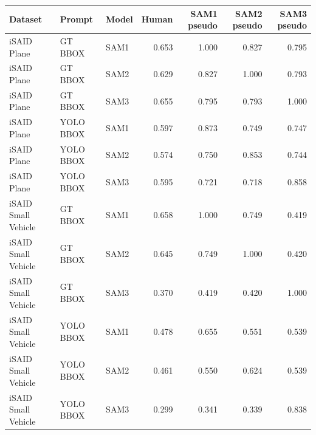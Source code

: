 \begin{tabular}{lllrrrr}
\toprule
Dataset & Prompt & Model & Human & SAM1 pseudo & SAM2 pseudo & SAM3 pseudo \\
\midrule
iSAID Plane & GT BBOX & SAM1 & 0.653 & 1.000 & 0.827 & 0.795 \\
iSAID Plane & GT BBOX & SAM2 & 0.629 & 0.827 & 1.000 & 0.793 \\
iSAID Plane & GT BBOX & SAM3 & 0.655 & 0.795 & 0.793 & 1.000 \\
iSAID Plane & YOLO BBOX & SAM1 & 0.597 & 0.873 & 0.749 & 0.747 \\
iSAID Plane & YOLO BBOX & SAM2 & 0.574 & 0.750 & 0.853 & 0.744 \\
iSAID Plane & YOLO BBOX & SAM3 & 0.595 & 0.721 & 0.718 & 0.858 \\
iSAID Small Vehicle & GT BBOX & SAM1 & 0.658 & 1.000 & 0.749 & 0.419 \\
iSAID Small Vehicle & GT BBOX & SAM2 & 0.645 & 0.749 & 1.000 & 0.420 \\
iSAID Small Vehicle & GT BBOX & SAM3 & 0.370 & 0.419 & 0.420 & 1.000 \\
iSAID Small Vehicle & YOLO BBOX & SAM1 & 0.478 & 0.655 & 0.551 & 0.539 \\
iSAID Small Vehicle & YOLO BBOX & SAM2 & 0.461 & 0.550 & 0.624 & 0.539 \\
iSAID Small Vehicle & YOLO BBOX & SAM3 & 0.299 & 0.341 & 0.339 & 0.838 \\
\bottomrule
\end{tabular}
